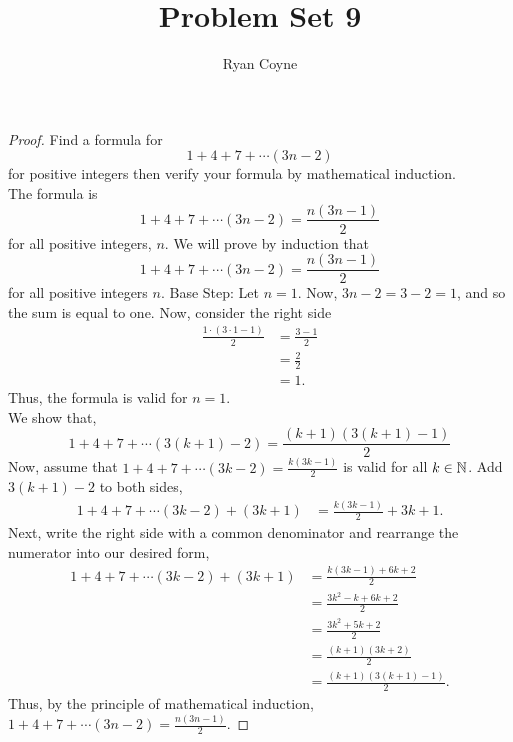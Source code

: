 \documentclass[12pt]{article}
\begin{document}
    \title{Problem Set 9}
    \author{Ryan Coyne}
    \maketitle

    \noindent\begin{proof}{Find a formula for \begin{equation*}
        1+4+7+ \cdots (3n-2)
    \end{equation*}
    for positive integers then verify your formula by mathematical induction.\\
    The formula is \begin{equation*}
        1+4+7+ \cdots (3n-2) = \frac{n(3n-1)}{2}
    \end{equation*}
    for all positive integers, \(n\).}
    We will prove by induction that 
    \begin{equation*}
        1+4+7+ \cdots (3n-2) = \frac{n(3n-1)}{2}
    \end{equation*}
    for all positive integers \(n\). 
    Base Step: Let \(n=1\). Now, \(3n-2=3-2=1\), and so the sum is equal to one. Now, consider the right side \begin{equation*}
        \begin{split}
            \frac{1\cdot(3\cdot 1-1)}{2} &= \frac{3-1}{2}\\
            &=\frac{2}{2}\\
            &=1.
        \end{split}
    \end{equation*}
    Thus, the formula is valid for \(n=1\).\\
    We show that,
    \begin{equation*}
        1+4+7+ \cdots (3(k+1)-2) = \frac{(k+1)(3(k+1)-1)}{2}
    \end{equation*}
    Now, assume that \(1+4+7+ \cdots (3k-2) = \frac{k(3k-1)}{2}\) is valid for all \(k\in \mathbb{N}\). Add \(3(k+1)-2\) to both sides,
    \begin{equation*}
        \begin{split}
            1+4+7+ \cdots (3k-2) + (3k+1) &= \frac{k(3k-1)}{2} + 3k+1.
        \end{split}
    \end{equation*}
    Next, write the right side with a common denominator and rearrange the numerator into our desired form,
    \begin{equation*}
        \begin{split}
            1+4+7+ \cdots (3k-2) + (3k+1) &= \frac{k(3k-1)+ 6k+2}{2}\\
            &=\frac{3k^2-k + 6k+2}{2}\\
            &=\frac{3k^2+5k+2}{2}\\
            &=\frac{(k+1)(3k+2)}{2}\\
            &=\frac{(k+1)(3(k+1)-1)}{2}.
        \end{split}
    \end{equation*}
    Thus, by the principle of mathematical induction, \(1+4+7+ \cdots (3n-2) = \frac{n(3n-1)}{2}\).
    \end{proof}
\end{document}
